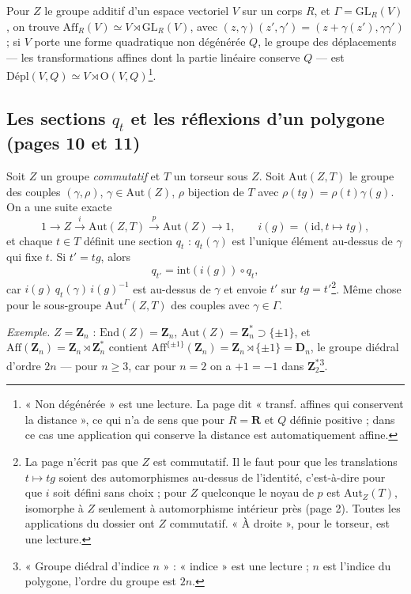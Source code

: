 \documentclass[11pt,a4paper]{article}
\begin{document}
Pour $Z$ le groupe additif d'un espace vectoriel $V$ sur un corps $R$, et
$\Gamma = \mathrm{GL}_R(V)$, on trouve $\mathrm{Aff}_R(V) \simeq V \rtimes
\mathrm{GL}_R(V)$, avec $(z, \gamma)(z', \gamma') = (z + \gamma(z'),
\gamma\gamma')$ ; si $V$ porte une forme quadratique non dégénérée $Q$, le
groupe des déplacements --- les transformations affines dont la partie linéaire
conserve $Q$ --- est $\mathrm{Dépl}(V, Q) \simeq V \rtimes \mathrm{O}(V,
Q)$\footnote{« Non dégénérée » est une lecture. La page dit « transf. affines
qui conservent la distance », ce qui n'a de sens que pour $R = \mathbf{R}$ et
$Q$ définie positive ; dans ce cas une application qui conserve la distance
est automatiquement affine.}.

\subsection*{Les sections $q_t$ et les réflexions d'un polygone (pages 10 et 11)}

Soit $Z$ un groupe \emph{commutatif} et $T$ un torseur sous $Z$. Soit
$\mathrm{Aut}(Z, T)$ le groupe des couples $(\gamma, \rho)$, $\gamma \in
\mathrm{Aut}(Z)$, $\rho$ bijection de $T$ avec $\rho(t g) = \rho(t)\gamma(g)$.
On a une suite exacte
\[
  1 \to Z \xrightarrow{i} \mathrm{Aut}(Z, T) \xrightarrow{p} \mathrm{Aut}(Z)
  \to 1, \qquad i(g) = (\mathrm{id}, t \mapsto t g),
\]
et chaque $t \in T$ définit une section $q_t$ : $q_t(\gamma)$ est l'unique
élément au-dessus de $\gamma$ qui fixe $t$. Si $t' = t g$, alors
\[
  q_{t'} = \mathrm{int}(i(g)) \circ q_t,
\]
car $i(g)\,q_t(\gamma)\,i(g)^{-1}$ est au-dessus de $\gamma$ et envoie $t'$ sur
$t g = t'$\footnote{La page n'écrit pas que $Z$ est commutatif. Il le faut
pour que les translations $t \mapsto t g$ soient des automorphismes au-dessus
de l'identité, c'est-à-dire pour que $i$ soit défini sans choix ; pour $Z$
quelconque le noyau de $p$ est $\mathrm{Aut}_Z(T)$, isomorphe à $Z$
seulement à automorphisme intérieur près (page 2). Toutes les applications
du dossier ont $Z$ commutatif. « À droite », pour le torseur, est une
lecture.}. Même chose pour le sous-groupe $\mathrm{Aut}^{\Gamma}(Z, T)$ des
couples avec $\gamma \in \Gamma$.

\emph{Exemple.} $Z = \mathbf{Z}_n$ : $\mathrm{End}(Z) = \mathbf{Z}_n$,
$\mathrm{Aut}(Z) = \mathbf{Z}_n^{*} \supset \{\pm 1\}$, et
$\mathrm{Aff}(\mathbf{Z}_n) = \mathbf{Z}_n \rtimes \mathbf{Z}_n^{*}$ contient
$\mathrm{Aff}^{\{\pm 1\}}(\mathbf{Z}_n) = \mathbf{Z}_n \rtimes \{\pm 1\} =
\mathbf{D}_n$, le groupe diédral d'ordre $2n$ --- pour $n \geq 3$, car pour
$n = 2$ on a $+1 = -1$ dans $\mathbf{Z}_2^{*}$\footnote{« Groupe diédral
d'indice $n$ » : « indice » est une lecture ; $n$ est l'indice du polygone,
l'ordre du groupe est $2n$.}.
\end{document}
